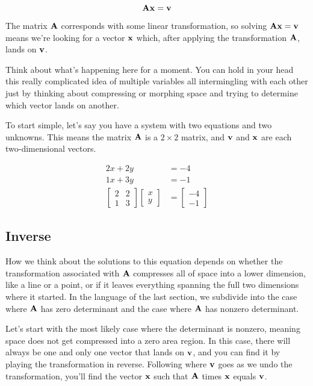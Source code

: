 \begin{equation*}
  \mathbf{A}\mathbf{x} = \mathbf{v}
\end{equation*}

The matrix $\mathbf{A}$ corresponds with some linear transformation, so solving
$\mathbf{A}\mathbf{x} = \mathbf{v}$ means we're looking for a vector $\mathbf{x}$ which,
after applying the transformation $\mathbf{A}$, lands on $\mathbf{v}$.

Think about what's happening here for a moment. You can hold in your head this
really complicated idea of multiple variables all intermingling with each other
just by thinking about compressing or morphing space and trying to determine
which vector lands on another.

To start simple, let's say you have a system with two equations and two
unknowns. This means the matrix $\mathbf{A}$ is a $2 \times 2$ matrix, and
$\mathbf{v}$ and $\mathbf{x}$ are each two-dimensional vectors.

\begin{align*}
  2x + 2y &= -4 \\
  1x + 3y &= -1 \\
  \begin{bmatrix}
    2 & 2 \\
    1 & 3
  \end{bmatrix}
  \begin{bmatrix}
    x \\
    y
  \end{bmatrix} &=
  \begin{bmatrix}
    -4 \\
    -1
  \end{bmatrix}
\end{align*}

\subsection{Inverse}

How we think about the solutions to this equation depends on whether the
transformation associated with $\mathbf{A}$ compresses all of space into a lower
dimension, like a line or a point, or if it leaves everything spanning the full
two dimensions where it started. In the language of the last section, we
subdivide into the case where $\mathbf{A}$ has zero determinant and the case where
$\mathbf{A}$ has nonzero determinant.

Let's start with the most likely case where the determinant is nonzero, meaning
space does not get compressed into a zero area region. In this case, there will
always be one and only one vector that lands on $\mathbf{v}$, and you can find it
by playing the transformation in reverse. Following where $\mathbf{v}$ goes as we
undo the transformation, you'll find the vector $\mathbf{x}$ such that $\mathbf{A}$
times $\mathbf{x}$ equals $\mathbf{v}$.

